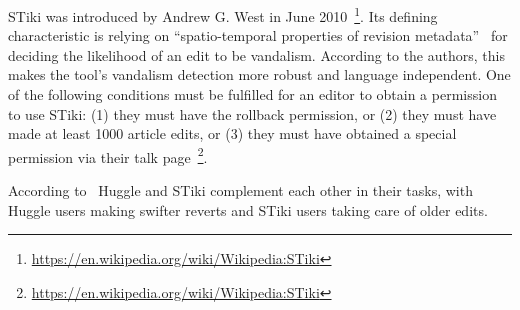 STiki was introduced by Andrew G. West in June 2010~\footnote{\url{https://en.wikipedia.org/wiki/Wikipedia:STiki}}.
Its defining characteristic is relying on ``spatio-temporal properties of revision metadata''~\cite{WestKanLee2010} for deciding the likelihood of an edit to be vandalism.
According to the authors, this makes the tool's vandalism detection more robust and language independent.
One of the following conditions must be fulfilled for an editor to obtain a permission to use STiki:
(1) they must have the rollback permission, or
(2) they must have made at least 1000 article edits, or
(3) they must have obtained a special permission via their talk page~\footnote{\url{https://en.wikipedia.org/wiki/Wikipedia:STiki}}.

According to~\cite{GeiHal2013} Huggle and STiki complement each other in their tasks, with Huggle users making swifter reverts and STiki users taking care of older edits.

